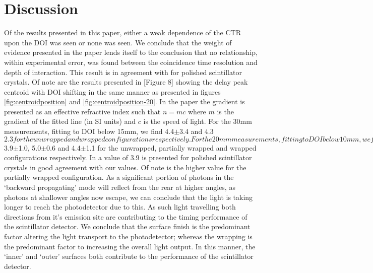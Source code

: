 \section{Discussion}
Of the results presented in this paper, either a weak dependence of the CTR upon the DOI was seen or none was seen. We conclude that the weight of evidence presented in the paper lends itself to the conclusion that no relationship, within experimental error, was found between the coincidence time resolution and depth of interaction. This result is in agreement with \cite{Bircher_Shao_2012} for polished scintillator crystals. Of note are the results presented in [Figure 8]\cite{Moses_Derenzo_1999} showing the delay peak centroid with DOI shifting in the same manner as presented in figures \ref{fig:centroidposition} and \ref{fig:centroidposition-20}. In the paper the gradient is presented as an effective refractive index such that $n=mc$ where $m$ is the gradient of the fitted line (in SI units) and $c$ is the speed of light. For the 30mm measurements, fitting to DOI below 15mm, we find 4.4$\pm$3.4 and $4.3$\pm$2.3 for the unwrapped and wrapped configurations respectively. For the 20mm measurements, fitting to DOI below 10mm, we find $3.9$\pm$1.0, 5.0$\pm$0.6 and 4.4$\pm$1.1 for the unwrapped, partially wrapped and wrapped configurations respectively. In \cite{Moses_Derenzo_1999} a value of 3.9 is presented for polished scintillator crystals in good agreement with our values. Of note is the higher value for the partially wrapped configuration. As a significant portion of photons in the `backward propagating' mode will reflect from the rear at higher angles, as photons at shallower angles now escape, we can conclude that the light is taking longer to reach the photodetector due to this. As such light travelling both directions from it's emission site are contributing to the timing performance of the scintillator detector. We conclude that the surface finish is the predominant factor altering the light transport to the photodetector; whereas the wrapping is the predominant factor to increasing the overall light output. In this manner, the `inner' and `outer' surfaces both contribute to the performance of the scintillator detector.